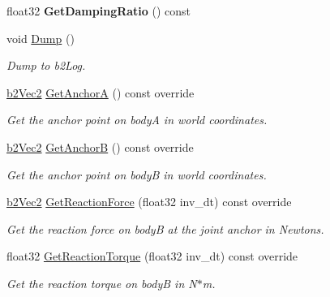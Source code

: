 \begin{DoxyCompactItemize}
float32 {\bfseries Get\+Damping\+Ratio} () const
\item 
\mbox{\label{classb2WeldJoint_a2fd073c5e6264e98592240308a006981}} 
void \hyperlink{classb2WeldJoint_a2fd073c5e6264e98592240308a006981}{Dump} ()
\begin{DoxyCompactList}\small\item\em Dump to b2\+Log. \end{DoxyCompactList}\item 
\mbox{\label{classb2WeldJoint_ac675d0b09a4d9567d85bcba8821785bc}} 
\hyperlink{structb2Vec2}{b2\+Vec2} \hyperlink{classb2WeldJoint_ac675d0b09a4d9567d85bcba8821785bc}{Get\+AnchorA} () const override
\begin{DoxyCompactList}\small\item\em Get the anchor point on bodyA in world coordinates. \end{DoxyCompactList}\item 
\mbox{\label{classb2WeldJoint_ac97596e42af760d0a035b15213d3341a}} 
\hyperlink{structb2Vec2}{b2\+Vec2} \hyperlink{classb2WeldJoint_ac97596e42af760d0a035b15213d3341a}{Get\+AnchorB} () const override
\begin{DoxyCompactList}\small\item\em Get the anchor point on bodyB in world coordinates. \end{DoxyCompactList}\item 
\mbox{\label{classb2WeldJoint_ae5a6e89a36fc7fec7aae528ec2895308}} 
\hyperlink{structb2Vec2}{b2\+Vec2} \hyperlink{classb2WeldJoint_ae5a6e89a36fc7fec7aae528ec2895308}{Get\+Reaction\+Force} (float32 inv\+\_\+dt) const override
\begin{DoxyCompactList}\small\item\em Get the reaction force on bodyB at the joint anchor in Newtons. \end{DoxyCompactList}\item 
\mbox{\label{classb2WeldJoint_aa591fa3cb8238eefa2b39cb7422ff07c}} 
float32 \hyperlink{classb2WeldJoint_aa591fa3cb8238eefa2b39cb7422ff07c}{Get\+Reaction\+Torque} (float32 inv\+\_\+dt) const override
\begin{DoxyCompactList}\small\item\em Get the reaction torque on bodyB in N$\ast$m. \end{DoxyCompactList}\item 

\end{DoxyCompactItemize}
